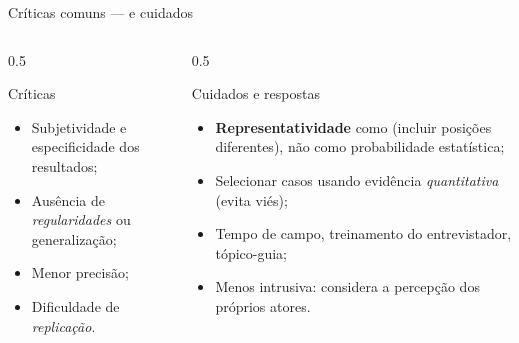 \begin{frame}{Críticas comuns --- e cuidados}
  \begin{columns}[T]
    \begin{column}{0.5\textwidth}
      \begin{block}{Críticas}
        \small
        \begin{itemize}
          \item \alert{Subjetividade} e especificidade dos resultados;
          \item Ausência de \emph{regularidades} ou generalização;
          \item Menor precisão;
          \item Dificuldade de \emph{replicação}.
        \end{itemize}
      \end{block}
    \end{column}
    \begin{column}{0.5\textwidth}
      \begin{block}{Cuidados e respostas}
        \small
        \begin{itemize}
          \item \textbf{Representatividade} como  (incluir posições diferentes), não como probabilidade estatística;
          \item Selecionar casos usando evidência \emph{quantitativa} (evita viés);
          \item Tempo de campo, treinamento do entrevistador, tópico-guia;
          \item Menos intrusiva: considera a percepção dos próprios atores.
        \end{itemize}
      \end{block}
    \end{column}
  \end{columns}
\end{frame}

